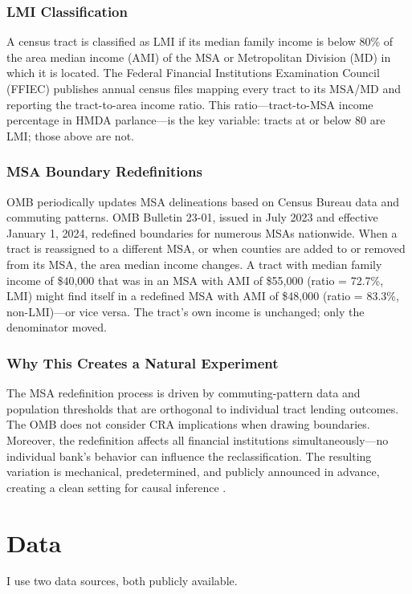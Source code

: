 \documentclass[12pt]{article}
\begin{document}
\subsubsection*{LMI Classification} A census tract is classified as LMI if its median family income is below 80\% of the area median income (AMI) of the MSA or Metropolitan Division (MD) in which it is located. The Federal Financial Institutions Examination Council (FFIEC) publishes annual census files mapping every tract to its MSA/MD and reporting the tract-to-area income ratio. This ratio---tract-to-MSA income percentage in HMDA parlance---is the key variable: tracts at or below 80 are LMI; those above are not.

\subsubsection*{MSA Boundary Redefinitions} OMB periodically updates MSA delineations based on Census Bureau data and commuting patterns. OMB Bulletin 23-01, issued in July 2023 and effective January 1, 2024, redefined boundaries for numerous MSAs nationwide. When a tract is reassigned to a different MSA, or when counties are added to or removed from its MSA, the area median income changes. A tract with median family income of \$40,000 that was in an MSA with AMI of \$55,000 (ratio = 72.7\%, LMI) might find itself in a redefined MSA with AMI of \$48,000 (ratio = 83.3\%, non-LMI)---or vice versa. The tract's own income is unchanged; only the denominator moved.

\subsubsection*{Why This Creates a Natural Experiment} The MSA redefinition process is driven by commuting-pattern data and population thresholds that are orthogonal to individual tract lending outcomes. The OMB does not consider CRA implications when drawing boundaries. Moreover, the redefinition affects all financial institutions simultaneously---no individual bank's behavior can influence the reclassification. The resulting variation is mechanical, predetermined, and publicly announced in advance, creating a clean setting for causal inference \citep{ding2020effects}.

\section{Data}

I use two data sources, both publicly available.
\end{document}

